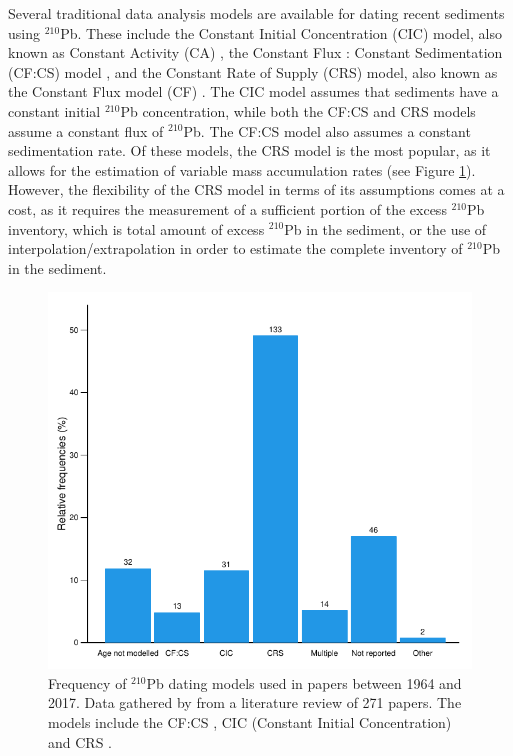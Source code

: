 \documentclass [10pt] {article}
\begin{document}
Several traditional data analysis models are available for dating recent sediments using $^{210}$Pb. These include the Constant Initial Concentration (CIC) model, also known as Constant Activity (CA) \citep{Goldberg1963, Robbins1975}, the Constant Flux : Constant Sedimentation (CF:CS) model \citep{Crozaz1964}, and the Constant Rate of Supply (CRS) model, also known as the Constant Flux model (CF) \citep{Appleby1978, Robbins1978, Sanchez-Cabeza2012}. The CIC model assumes that sediments have a constant initial $^{210}$Pb concentration, while both the CF:CS and CRS models assume a constant flux of $^{210}$Pb. The CF:CS model also assumes a constant sedimentation rate. Of these models, the CRS model is the most popular, as it allows for the estimation of variable mass accumulation rates (see Figure \ref{fig:210models}). However, the flexibility of the CRS model in terms of its assumptions comes at a cost, as it requires the measurement of a sufficient portion of the excess $^{210}$Pb inventory, which is total amount of excess $^{210}$Pb in the sediment, or the use of interpolation/extrapolation in order to estimate the complete inventory of $^{210}$Pb in the sediment.



\begin{figure}[h!]
	\begin{centering}
		\includegraphics[width=.75\linewidth]{barras.pdf}
		\caption{Frequency of $^{210}$Pb dating models used in papers between 1964 and 2017. Data gathered by \citet{Courtney2019} from a literature review of 271 papers. The models include the CF:CS \citep[Constant Flux - Constant Sedimentation;][]{Robbins1978}, CIC (Constant Initial Concentration) \citep{Goldberg1963,Crozaz1964,Robbins1978} and CRS  \citep[Constant Rate of Supply;][]{Appleby1978,Robbins1978}. }
		\label{fig:210models}
	\end{centering}
\end{figure}
\end{document}
